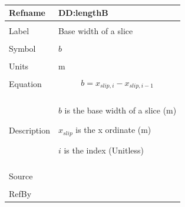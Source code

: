 \documentclass[12pt]{article}
\begin{document}
~\newline
 \noindent \begin{minipage}{\textwidth}
\begin{tabular}{p{} p{}}
\toprule \textbf{Refname} & \textbf{DD:lengthB}
\label{DD:lengthB}
\\ \midrule \\
Label & Base width of a slice
        \\ \midrule \\
        Symbol & $b$
                 \\ \midrule \\
                 Units & m
                         \\ \midrule \\
                         Equation & \begin{dmath}
                                    b={x_{slip,i}}-{x_{slip,i-1}}
                                    \end{dmath}
                                    \\ \midrule \\
                                    Description & \begin{symbDescription}
                                                  \item{$b$ is the base width of a slice (m)}
                                                  \item{${x_{slip}}$ is the x ordinate (m)}
                                                  \item{$i$ is the index (Unitless)}
                                                  \end{symbDescription}
                                                  \\ \midrule \\
                                                  Source & \cite{fredlund1977}
                                                           \\ \midrule \\
                                                           RefBy & 
\\ \bottomrule \end{tabular}
\end{minipage}\\
~\newline
\end{document}
